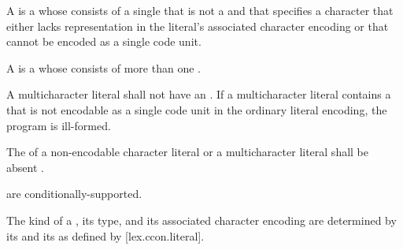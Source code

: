 \documentclass{wg21}
\begin{document}
    \pnum
    \begin{removedblock}
        A 
        is a 
        whose  consists of a single 
        that is not a  and
        that specifies a character
        that either lacks representation in the literal's associated character encoding
        or that cannot be encoded as a single code unit.
    \end{removedblock}
    A  is a 
    whose  consists of
    more than one .
    \begin{addedblock}
        A multicharacter literal shall not have an .
        If a multicharacter literal contains a  that is not encodable as a single code unit in the ordinary literal encoding, the program is ill-formed.
    \end{addedblock}
    
    \begin{removedblock}
        The  of
        a non-encodable character literal or
        a multicharacter literal
        shall be absent .
    \end{removedblock}
    
     are conditionally-supported.
    
    \pnum
    The kind of a ,
    its type, and its associated character encoding
    are determined by
    its  and its 
    as defined by [lex.ccon.literal].
    
\end{document}
